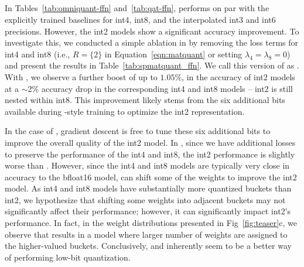 




\vspace*{-2mm}
\subsection{\spalg}
\label{sec:spmatquant}
In Tables~\ref{tab:omniquant-ffn} and~\ref{tab:qat-ffn}, \alg performs on par with the explicitly trained baselines for int4, int8, and the interpolated int3 and int6 precisions. However, the int2 models show a significant accuracy improvement. To investigate this, we conducted a simple ablation in \alg by removing the loss terms for int4 and int8 (i.e., $R = \{2\}$ in Equation~\ref{eqn:matquant} or setting $\lambda_4=\lambda_8=0$) and present the results in Table~\ref{tab:spmatquant_ffn}. We call this version of \alg as \spalg. With \spalg, we observe a further boost of up to $1.05\%$, in the accuracy of int2 models at a $\sim$2\% accuracy drop in the corresponding int4 and int8 models -- int2 is still nested within int8. This improvement likely stems from the six additional bits available during \alg-style training to optimize the int2 representation. 

In the case of \spalg, gradient descent is free to tune these six additional bits to improve the overall quality of the int2 model. In \alg, since we have additional losses to preserve the performance of the int4 and int8, the int2 performance is slightly worse than  \spalg. However, since the int4 and int8 models are typically very close in accuracy to the bfloat16 model, \alg can shift some of the weights to improve the int2 model. As int4 and int8 models have substantially more quantized buckets than int2, we hypothesize that shifting some weights into adjacent buckets may not significantly affect their performance; however, it can significantly impact int2's performance. In fact, in the weight distributions presented in Fig~\ref{fig:teaser}c, we observe that \alg results in a model where larger number of weights are assigned to the higher-valued buckets. Conclusively, \alg and \spalg inherently seem to be a better way of performing low-bit quantization.

